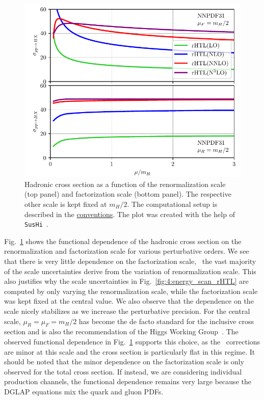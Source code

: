 \begin{figure}[ht]
\centering
\includegraphics[width=\figurewidth]{Images/scale_scan.pdf}
\caption{Hadronic cross section as a function of the renormalization scale (top panel) and factorization scale (bottom panel). The respective other scale is kept fixed at $m_H/2$. The computational setup is described in the \hyperref[chap:notation_and_conventions]{conventions}. The plot was created with the help of \texttt{SusHi}~\cite{Harlander:2012pb, Harlander:2016hcx}.}
\label{fig:4:scale_scan}
\end{figure}
Fig.~\ref{fig:4:scale_scan} shows the functional dependence of the hadronic cross section on the renormalization and factorization scale for various perturbative orders. We see that there is very little dependence on the factorization scale, \ie\ the vast majority of the scale uncertainties derive from the variation of renormalization scale. This also justifies why the scale uncertainties in Fig.~\ref{fig:4:energy_scan_rHTL} are computed by only varying the renormalization scale, while the factorization scale was kept fixed at the central value. We also observe that the dependence on the scale nicely stabilizes as we increase the perturbative precision. For the central scale, $\mu_R = \mu_F = m_H/2$ has become the de facto standard for the inclusive cross section and is also the recommendation of the Higgs Working Group~\cite{LHCHiggsCrossSectionWorkingGroup:2016ypw}. The observed functional dependence in Fig.~\ref{fig:4:scale_scan} supports this choice, as the \NNNLO\ corrections are minor at this scale and the cross section is particularly flat in this regime. It should be noted that the minor dependence on the factorization scale is only observed for the total cross section. If instead, we are considering individual production channels, the functional dependence remains very large because the DGLAP equations mix the quark and gluon \acs{PDF}s.

